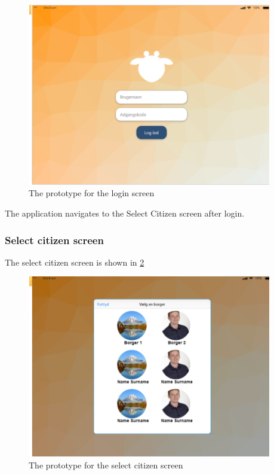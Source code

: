 \begin{figure}[H]
    \begin{center}
        \includegraphics[width=0.95\textwidth]{figures/Prototypes/LoginScreenPrototype.png}
    \end{center}
    \caption{The prototype for the login screen}
    \label{fig:LoginProt}
\end{figure}
The application navigates to the Select Citizen screen after login. 

\subsubsection*{Select citizen screen}
The select citizen screen is shown in \ref{fig:ChooseCitProt}

\begin{figure}[H]
    \begin{center}
        \includegraphics[width=0.95\textwidth]{figures/Prototypes/ChooseCitizenPrototype.png}
    \end{center}
    \caption{The prototype for the select citizen screen}
    \label{fig:ChooseCitProt}
\end{figure}


